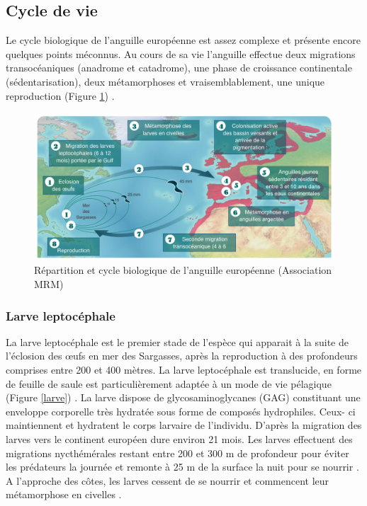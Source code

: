 \documentclass[11pt,titlepage,twoside]{article}\usepackage[]{graphicx}\usepackage[table]{xcolor}
\begin{document}
\subsection{Cycle de vie}

Le cycle biologique de l’anguille européenne est assez complexe et présente encore quelques points méconnus. Au cours de sa vie l’anguille effectue deux migrations transocéaniques (anadrome et catadrome), une phase de croissance continentale (sédentarisation), deux métamorphoses et vraisemblablement, une unique reproduction (Figure \ref{Cycle}) \citep{anthony_bases_2006}. 

\begin{figure}[htpb]
\centering
\includegraphics[width=\textwidth]{Cycle}
\caption{Répartition et cycle biologique de l'anguille européenne (Association MRM)}
\label{Cycle}
\end{figure}

\subsubsection{Larve leptocéphale}

La larve leptocéphale est le premier stade de l’espèce qui apparait à la suite de l’éclosion des œufs en mer des Sargasses, après la reproduction à des profondeurs comprises entre 200 et 400 mètres. La larve leptocéphale est translucide, en forme de feuille de saule est particulièrement adaptée à un mode de vie pélagique (Figure \ref{larve}) \citep{edeline_role_2005}. La larve dispose de glycosaminoglycanes (GAG) constituant une enveloppe corporelle très hydratée sous forme de composés hydrophiles. Ceux- ci maintiennent et hydratent le corps larvaire de l’individu. D’après \citep{bonhommeau_duration_2010} la migration des larves vers le continent européen dure environ 21 mois. Les larves effectuent des migrations nycthémérales restant entre 200 et 300 m de profondeur pour éviter les prédateurs la journée et remonte à 25 m de la surface la nuit pour se nourrir \citep{castonguay_vertical_1987}. A l’approche des côtes, les larves cessent de se nourrir \citep{edeline_role_2005} et commencent leur métamorphose en civelles \citep{hirschinger_donnees_2015}.
\end{document}
